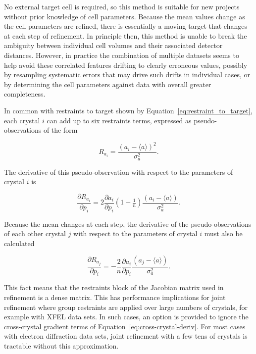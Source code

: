 \documentclass[preprint]{iucr}
\newcommand{\pder}[2][]{\frac{\partial#1}{\partial#2}}
\begin{document}
No external target cell is required, so this method is suitable for new
projects without prior knowledge of cell parameters. Because the mean values
change as the cell parameters are refined, there is essentially a moving target
that changes at each step of refinement. In principle then, this method is
unable to break the ambiguity between individual cell volumes and their
associated detector distances. However, in practice the combination of multiple
datasets seems to help avoid these correlated features drifting to clearly
erroneous values, possibly by resampling systematic errors that may drive such
drifts in individual cases, or by determining the cell parameters against data
with overall greater completeness.

In common with restraints to target shown by
Equation~\ref{eq:restraint_to_target}, each crystal $i$ can add up to six
restraints terms, expressed as pseudo-observations of the form

\begin{equation}
R_{a_i} = \frac{\left( a_i - \langle a \rangle \right)^2}{\sigma_a^2}.
\end{equation}

The derivative of this pseudo-observation with respect to the parameters of crystal $i$ is

\begin{equation}
\pder[R_{a_i}]{p_i} = 2 \pder[a_i]{p_i} \left( 1 - \tfrac{1}{n} \right) \frac{\left( a_i - \langle a \rangle \right)}{\sigma_a^2}.
\end{equation}

Because the mean changes at each step, the derivative of the
pseudo-observations of each other crystal $j$ with respect to the parameters of
crystal $i$ must also be calculated

\begin{equation}
\label{eq:cross-crystal-deriv}
\pder[R_{a_j}]{p_i} = -\frac{2}{n} \pder[a_i]{p_i} \frac{\left( a_j - \langle a \rangle \right)}{\sigma_a^2}.
\end{equation}

This fact means that the restraints block of the Jacobian matrix used in
refinement is a dense matrix. This has performance implications for joint
refinement where group restraints are applied over large numbers of crystals,
for example with XFEL data sets. In such cases, an option is provided to ignore
the cross-crystal gradient terms of Equation~\ref{eq:cross-crystal-deriv}. For
most cases with electron diffraction data sets, joint refinement with a few
tens of crystals is tractable without this approximation.
\end{document}
